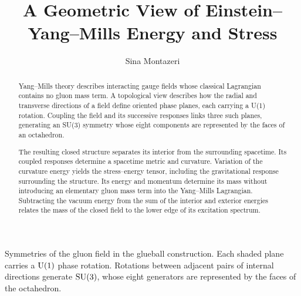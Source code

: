 \documentclass[11pt]{article}
\title{A Geometric View of Einstein--Yang--Mills Energy and Stress}
\author{Sina Montazeri}
\date{}
\theoremstyle{definition}
\begin{document}
\maketitle
\begin{abstract}
Yang--Mills theory describes interacting gauge fields whose classical Lagrangian contains no gluon mass term. A topological view describes how the radial and transverse directions of a field define oriented phase planes, each carrying a U(1) rotation. Coupling the field and its successive responses links three such planes, generating an SU(3) symmetry whose eight components are represented by the faces of an octahedron.

The resulting closed structure separates its interior from the surrounding spacetime. Its coupled responses determine a spacetime metric and curvature. Variation of the curvature energy yields the stress--energy tensor, including the gravitational response surrounding the structure. Its energy and momentum determine its mass without introducing an elementary gluon mass term into the Yang--Mills Lagrangian. Subtracting the vacuum energy from the sum of the interior and exterior energies relates the mass of the closed field to the lower edge of its excitation spectrum.
\end{abstract}
\par\medskip\begingroup\centering
{}\par
\smallskip
\begin{minipage}{.82\textwidth}\centering\small
Symmetries of the gluon field in the glueball construction. Each shaded
plane carries a \(\mathrm{U}(1)\) phase rotation. Rotations between adjacent
pairs of internal directions generate \(\mathrm{SU}(3)\), whose eight generators
are represented by the faces of the octahedron.
\end{minipage}\par
\endgroup
\clearpage








\clearpage
\appendix

\clearpage

\clearpage

\clearpage


\end{document}
